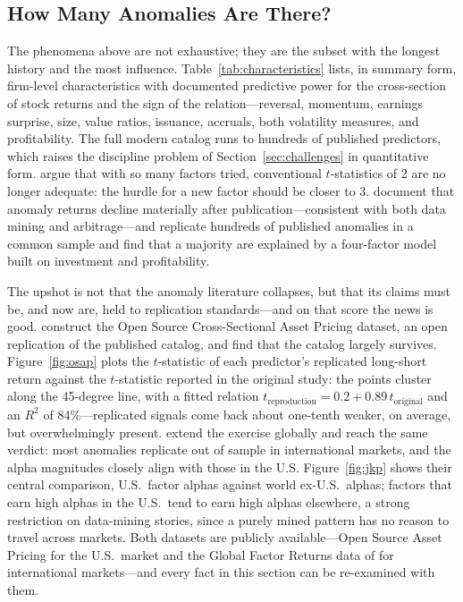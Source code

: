 \subsection{How Many Anomalies Are There?}
\label{sec:bestiary}

The phenomena above are not exhaustive; they are the subset with the longest history and the most influence. Table~\ref{tab:characteristics} lists, in summary form, firm-level characteristics with documented predictive power for the cross-section of stock returns and the sign of the relation---reversal, momentum, earnings surprise, size, value ratios, issuance, accruals, both volatility measures, and profitability. The full modern catalog runs to hundreds of published predictors, which raises the discipline problem of Section~\ref{sec:challenges} in quantitative form. \citet{harvey2016} argue that with so many factors tried, conventional $t$-statistics of 2 are no longer adequate: the hurdle for a new factor should be closer to 3. \citet{mclean2016} document that anomaly returns decline materially after publication---consistent with both data mining and arbitrage---and \citet{hou2020} replicate hundreds of published anomalies in a common sample and find that a majority are explained by a four-factor model built on investment and profitability.

The upshot is not that the anomaly literature collapses, but that its claims must be, and now are, held to replication standards---and on that score the news is good. \citet{chen2022} construct the Open Source Cross-Sectional Asset Pricing dataset, an open replication of the published catalog, and find that the catalog largely survives. Figure~\ref{fig:osap} plots the $t$-statistic of each predictor's replicated long-short return against the $t$-statistic reported in the original study: the points cluster along the 45-degree line, with a fitted relation $t_{\text{reproduction}} = 0.2 + 0.89\, t_{\text{original}}$ and an $R^2$ of 84\%---replicated signals come back about one-tenth weaker, on average, but overwhelmingly present. \citet{jensen2023} extend the exercise globally and reach the same verdict: most anomalies replicate out of sample in international markets, and the alpha magnitudes closely align with those in the U.S. Figure~\ref{fig:jkp} shows their central comparison, U.S.\ factor alphas against world ex-U.S.\ alphas; factors that earn high alphas in the U.S.\ tend to earn high alphas elsewhere, a strong restriction on data-mining stories, since a purely mined pattern has no reason to travel across markets. Both datasets are publicly available---Open Source Asset Pricing for the U.S.\ market and the Global Factor Returns data of \citet{jensen2023} for international markets---and every fact in this section can be re-examined with them.


